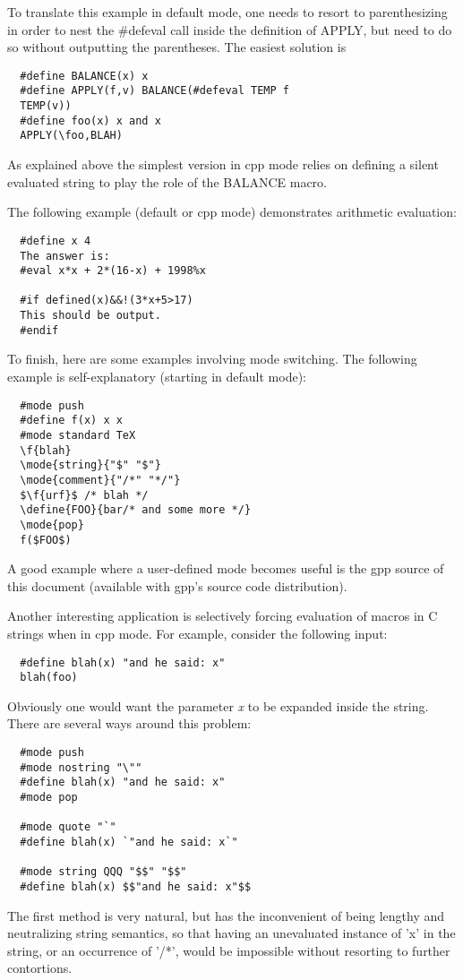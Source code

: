 To translate this example in default mode, one needs to resort to
parenthesizing in order to nest the \#defeval call inside the definition
of APPLY, but need to do so without outputting the parentheses. The
easiest solution is
\begin{verbatim}
  #define BALANCE(x) x
  #define APPLY(f,v) BALANCE(#defeval TEMP f
  TEMP(v))
  #define foo(x) x and x
  APPLY(\foo,BLAH)
\end{verbatim}
As explained above the simplest version in cpp mode relies on defining
a silent evaluated string to play the role of the BALANCE macro.


The following example (default or cpp mode) demonstrates arithmetic 
evaluation:
\begin{verbatim}
  #define x 4
  The answer is:
  #eval x*x + 2*(16-x) + 1998%x

  #if defined(x)&&!(3*x+5>17)
  This should be output.
  #endif
\end{verbatim}
To finish, here are some examples involving mode switching. 
The following example is self-explanatory (starting in default mode):
\begin{verbatim}
  #mode push
  #define f(x) x x
  #mode standard TeX
  \f{blah}
  \mode{string}{"$" "$"}
  \mode{comment}{"/*" "*/"}
  $\f{urf}$ /* blah */
  \define{FOO}{bar/* and some more */}
  \mode{pop}
  f($FOO$)
\end{verbatim}
A good example where a user-defined mode becomes useful is the gpp 
source of this document (available with gpp's source code distribution).


Another interesting application is selectively forcing evaluation of macros 
in C strings when in cpp mode. For example, consider the following input:
\begin{verbatim}
  #define blah(x) "and he said: x"
  blah(foo)
\end{verbatim}
Obviously one would want the parameter {\it x} to be expanded inside the
string. There are several ways around this problem:
\begin{verbatim}
  #mode push
  #mode nostring "\""
  #define blah(x) "and he said: x"
  #mode pop

  #mode quote "`"
  #define blah(x) `"and he said: x`"

  #mode string QQQ "$$" "$$"
  #define blah(x) $$"and he said: x"$$
\end{verbatim}
The first method is very natural, but has the inconvenient of being lengthy
and neutralizing string semantics, so that having an unevaluated instance
of 'x' in the string, or an occurrence of '/*', would be impossible without
resorting to further contortions. 

